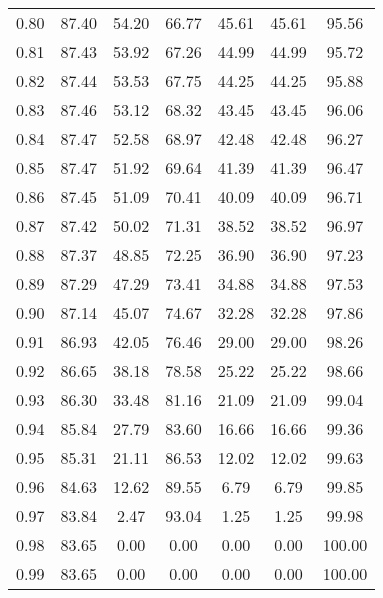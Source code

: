 \begin{tabular}{|c|c|c|c|c|c|c|}
      0.80 &     87.40 &     54.20 &      66.77 &   45.61 &      45.61 &         95.56 \\
      0.81 &     87.43 &     53.92 &      67.26 &   44.99 &      44.99 &         95.72 \\
      0.82 &     87.44 &     53.53 &      67.75 &   44.25 &      44.25 &         95.88 \\
      0.83 &     87.46 &     53.12 &      68.32 &   43.45 &      43.45 &         96.06 \\
      0.84 &     87.47 &     52.58 &      68.97 &   42.48 &      42.48 &         96.27 \\
      0.85 &     87.47 &     51.92 &      69.64 &   41.39 &      41.39 &         96.47 \\
      0.86 &     87.45 &     51.09 &      70.41 &   40.09 &      40.09 &         96.71 \\
      0.87 &     87.42 &     50.02 &      71.31 &   38.52 &      38.52 &         96.97 \\
      0.88 &     87.37 &     48.85 &      72.25 &   36.90 &      36.90 &         97.23 \\
      0.89 &     87.29 &     47.29 &      73.41 &   34.88 &      34.88 &         97.53 \\
      0.90 &     87.14 &     45.07 &      74.67 &   32.28 &      32.28 &         97.86 \\
      0.91 &     86.93 &     42.05 &      76.46 &   29.00 &      29.00 &         98.26 \\
      0.92 &     86.65 &     38.18 &      78.58 &   25.22 &      25.22 &         98.66 \\
      0.93 &     86.30 &     33.48 &      81.16 &   21.09 &      21.09 &         99.04 \\
      0.94 &     85.84 &     27.79 &      83.60 &   16.66 &      16.66 &         99.36 \\
      0.95 &     85.31 &     21.11 &      86.53 &   12.02 &      12.02 &         99.63 \\
      0.96 &     84.63 &     12.62 &      89.55 &    6.79 &       6.79 &         99.85 \\
      0.97 &     83.84 &      2.47 &      93.04 &    1.25 &       1.25 &         99.98 \\
      0.98 &     83.65 &      0.00 &       0.00 &    0.00 &       0.00 &        100.00 \\
      0.99 &     83.65 &      0.00 &       0.00 &    0.00 &       0.00 &        100.00 \\
\bottomrule
\end{tabular}

